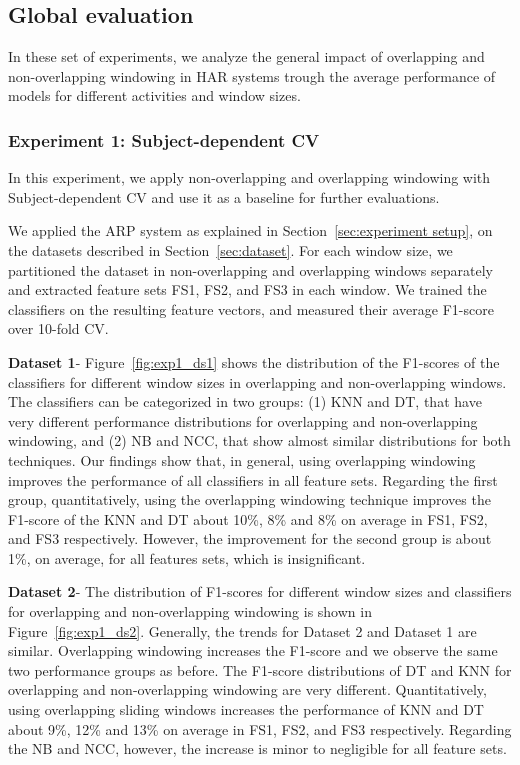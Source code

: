 \documentclass[sensors,article,submit,moreauthors,pdftex]{Definitions/mdpi}
\begin{document}
\subsection{Global evaluation}\label{global_evaluation}
In these set of experiments, we analyze the general impact of overlapping and non-overlapping windowing in HAR systems trough the average performance of models for different activities and window sizes. 
\subsubsection{Experiment 1: Subject-dependent CV} \label{sec:ex1}
In this experiment, we apply non-overlapping and overlapping windowing with Subject-dependent CV and use it as a baseline
for further evaluations. 

We applied the ARP system as explained in Section~\ref{sec:experiment setup}, on the datasets described in Section~\ref{sec:dataset}. For each window size, we partitioned the dataset in non-overlapping and overlapping windows separately and extracted feature sets FS1, FS2, and FS3 in each window. We trained the classifiers on the resulting feature vectors, and measured their average F1-score over 10-fold CV.

\noindent\textbf{Dataset 1}- Figure~\ref{fig:exp1_ds1} shows the distribution of the F1-scores of the classifiers for different window sizes in overlapping and non-overlapping windows. The classifiers can be categorized in two groups: (1) KNN and DT, that have very different performance distributions for overlapping and non-overlapping windowing, and (2) NB and NCC, that show almost similar distributions for both techniques. Our findings show that, in general, using overlapping windowing improves the performance of all classifiers in all feature sets. Regarding the first group, quantitatively, using the overlapping windowing technique improves the F1-score of the KNN and DT about 10\%, 8\% and 8\% on average in FS1, FS2, and FS3 respectively. However, the improvement for the second group is about 1\%, on average, for all features sets, which is insignificant.

\noindent\textbf{Dataset 2}- The distribution of F1-scores for different window sizes and classifiers for overlapping and non-overlapping windowing is shown in Figure~\ref{fig:exp1_ds2}. Generally, the trends for Dataset 2 and Dataset 1 are similar. Overlapping windowing increases the F1-score and we observe the same two performance groups as before. The F1-score distributions of DT and KNN for overlapping and non-overlapping windowing are very different. Quantitatively, using overlapping sliding windows increases the performance of KNN and DT about 9\%, 12\% and 13\% on average in FS1, FS2, and FS3 respectively. Regarding the NB and NCC, however, the increase is minor to negligible for all feature sets. 
\end{document}
